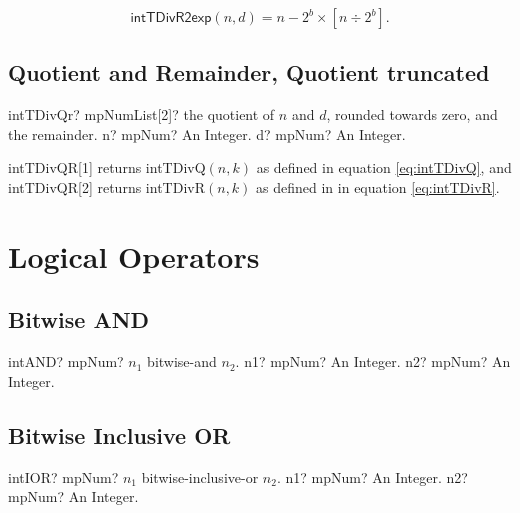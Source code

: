 \begin{equation}
	\label{eq:intTDivR2exp}
	\textsf{intTDivR2exp}(n, d) =n - 2^b \times \left[ n \div 2^b\right].
\end{equation}





\subsection{Quotient and Remainder,  Quotient truncated}

\begin{mpFunctionsExtract}
	\mpFunctionTwo
	{intTDivQr? mpNumList[2]? the quotient of $n$ and $d$, rounded towards zero, and the remainder.}
	{n? mpNum? An Integer.}
	{d? mpNum? An Integer.}
\end{mpFunctionsExtract}

\vspace{0.3cm}
\textsf{intTDivQR}[1] returns \textsf{intTDivQ$(n, k)$} as defined in equation \ref{eq:intTDivQ}, and \textsf{intTDivQR}[2] returns \textsf{intTDivR$(n, k)$} as defined in in equation \ref{eq:intTDivR}.




\section{Logical Operators }
\label{LogicalOperatorsInt}



\subsection{Bitwise AND}

\begin{mpFunctionsExtract}
	\mpFunctionTwo
	{intAND? mpNum? $n_1$ bitwise-and $n_2$.}
	{n1? mpNum? An Integer.}
	{n2? mpNum? An Integer.}
\end{mpFunctionsExtract}






\subsection{Bitwise Inclusive OR}

\begin{mpFunctionsExtract}
	\mpFunctionTwo
	{intIOR? mpNum? $n_1$ bitwise-inclusive-or $n_2$.}
	{n1? mpNum? An Integer.}
	{n2? mpNum? An Integer.}
\end{mpFunctionsExtract}





